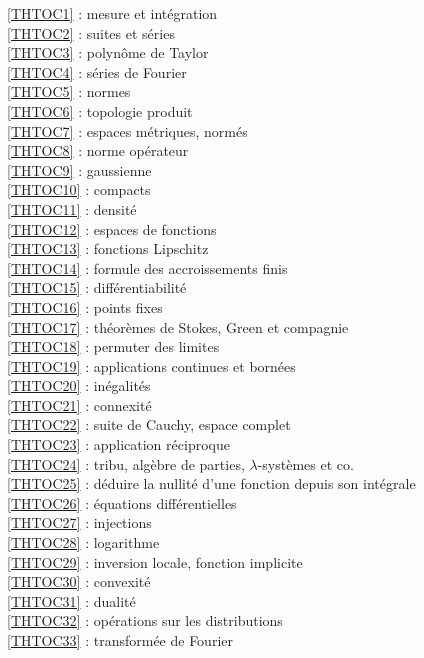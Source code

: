 \ref {THTOC1} : mesure et intégration\\
\ref {THTOC2} : suites et séries\\
\ref {THTOC3} : polynôme de Taylor\\
\ref {THTOC4} : séries de Fourier\\
\ref {THTOC5} : normes\\
\ref {THTOC6} : topologie produit\\
\ref {THTOC7} : espaces métriques, normés\\
\ref {THTOC8} : norme opérateur\\
\ref {THTOC9} : gaussienne\\
\ref {THTOC10} : compacts\\
\ref {THTOC11} : densité\\
\ref {THTOC12} : espaces de fonctions\\
\ref {THTOC13} : fonctions Lipschitz\\
\ref {THTOC14} : formule des accroissements finis\\
\ref {THTOC15} : différentiabilité\\
\ref {THTOC16} : points fixes\\
\ref {THTOC17} : théorèmes de Stokes, Green et compagnie\\
\ref {THTOC18} : permuter des limites\\
\ref {THTOC19} : applications continues et bornées\\
\ref {THTOC20} : inégalités\\
\ref {THTOC21} : connexité\\
\ref {THTOC22} : suite de Cauchy, espace complet\\
\ref {THTOC23} : application réciproque\\
\ref {THTOC24} : tribu, algèbre de parties, \( \lambda \)-systèmes et co.\\
\ref {THTOC25} : déduire la nullité d'une fonction depuis son intégrale\\
\ref {THTOC26} : équations différentielles\\
\ref {THTOC27} : injections\\
\ref {THTOC28} : logarithme\\
\ref {THTOC29} : inversion locale, fonction implicite\\
\ref {THTOC30} : convexité\\
\ref {THTOC31} : dualité\\
\ref {THTOC32} : opérations sur les distributions\\
\ref {THTOC33} : transformée de Fourier\\
